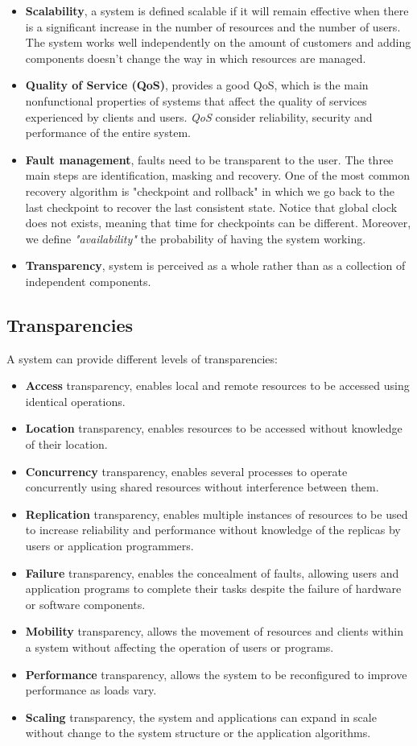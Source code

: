 \documentclass[11pt,a4paper]{article}
\begin{document}
\begin{itemize}
    \item \textbf{Scalability}, a system is defined scalable if it will remain effective when there is a significant increase in the number of resources and the number of users. The system works well independently on the amount of customers and adding components doesn't change the way in which resources are managed.
    \item \textbf{Quality of Service (QoS)}, provides a good QoS, which is the main nonfunctional properties of systems that affect the quality of services experienced by clients and users. \textit{QoS} consider reliability, security and performance of the entire system.
    \item \textbf{Fault management}, faults need to be transparent to the user. The three main steps are identification, masking and recovery. One of the most common recovery algorithm is "checkpoint and rollback" in which we go back to the last checkpoint to recover the last consistent state. Notice that global clock does not exists, meaning that time for checkpoints can be different. Moreover, we define \textit{"availability"} the probability of having the system working.
    \item \textbf{Transparency}, system is perceived as a whole rather than as a collection of independent components.
\end{itemize}

\subsection{Transparencies}
A system can provide different levels of transparencies:
\begin{itemize}
    \item \textbf{Access} transparency, enables local and remote resources to be accessed using identical operations.
    \item \textbf{Location} transparency, enables resources to be accessed without knowledge of their location.
    \item \textbf{Concurrency} transparency, enables several processes to operate concurrently using shared resources without interference between them. 
    \item \textbf{Replication} transparency, enables multiple instances of resources to be used to increase reliability and performance without knowledge of the replicas by users or application programmers.
    \item \textbf{Failure} transparency, enables the concealment of faults, allowing users and application programs to complete their tasks despite the failure of hardware or software components.
    \item \textbf{Mobility} transparency, allows the movement of resources and clients within a system without affecting the operation of users or programs.
    \item \textbf{Performance} transparency, allows the system to be reconfigured to improve performance as loads vary.
    \item \textbf{Scaling} transparency, the system and applications can expand in scale without change to the system structure or the application algorithms.
\end{itemize}
\end{document}
